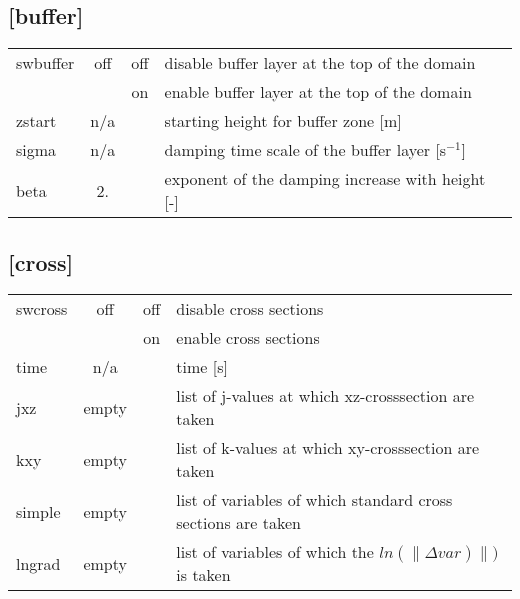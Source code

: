 \documentclass[a4paper,10pt]{extarticle}
\begin{document}
\subsection*{[buffer]}
\tablelasttail{\hline}
\begin{supertabular}{lccl}
swbuffer & off   & off & disable buffer layer at the top of the domain \\
         &       & on  & enable buffer layer at the top of the domain \\
zstart   & n/a   &     & starting height for buffer zone [m]\\
sigma    & n/a   &    & damping time scale of the buffer layer [s$^{-1}$]\\
beta     & 2.    &    & exponent of the damping increase with height [-] \\
\end{supertabular}
\subsection*{[cross]}
\tablelasttail{\hline}
\begin{supertabular}{lccl}
swcross       & off   & off & disable cross sections \\
              &       & on  & enable cross sections \\ 
time          & n/a   &     & time [s] \\
jxz           & empty &     & list of j-values at which xz-crosssection are taken \\
kxy           & empty &     & list of k-values at which xy-crosssection are taken \\
simple        & empty &     & list of variables of which standard cross sections are taken \\
lngrad        & empty &     & list of variables of which the $ln( \|\Delta var)\| )$ is taken \\
\end{supertabular}
\end{document}

